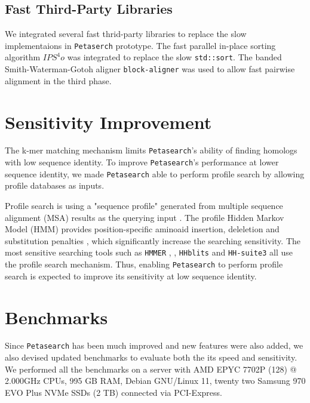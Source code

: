 \subsection{Fast Third-Party Libraries}

We integrated several fast thrid-party libraries to replace the slow implementaions in \texttt{Petaserch} prototype. The fast parallel in-place sorting algorithm $IPS^4o$ \cite{axtmann2017place} was integrated to replace the slow \texttt{std::sort}. The banded Smith-Waterman-Gotoh aligner \texttt{block-aligner} \cite{liu2021block} was used to allow fast pairwise alignment in the third phase.

\section{Sensitivity Improvement}

The k-mer matching mechanism limits \texttt{Petasearch}'s ability of finding homologs with low sequence identity. To improve \texttt{Petasearch}'s performance at lower sequence identity, we made \texttt{Petasearch} able to perform profile search by allowing profile databases as inputs.

Profile search is using a "sequence profile" generated from multiple sequence alignment (MSA) results as the querying input \cite{steinegger2019hh}. The profile Hidden Markov Model (HMM) provides position-specific aminoaid insertion, deleletion and substitution penalties \cite{steinegger2019hh}, which significantly increase the searching sensitivity. The most sensitive searching tools such as \texttt{HMMER} \cite{eddy2009new}, \cite{eddy2011accelerated}, \texttt{HHblits} \cite{remmert2012hhblits} and \texttt{HH-suite3} \cite{steinegger2019hh} all use the profile search mechanism. Thus, enabling \texttt{Petasearch} to perform profile search is expected to improve its sensitivity at low sequence identity.

\section{Benchmarks}

Since \texttt{Petasearch} has been much improved and new features were also added, we also devised updated benchmarks to evaluate both the its speed and sensitivity. We performed all the benchmarks on a server with AMD EPYC 7702P (128) @ 2.000GHz CPUs, 995 GB RAM, Debian GNU/Linux 11, twenty two Samsung 970 EVO Plus NVMe SSDs (2 TB) connected via PCI-Express.


